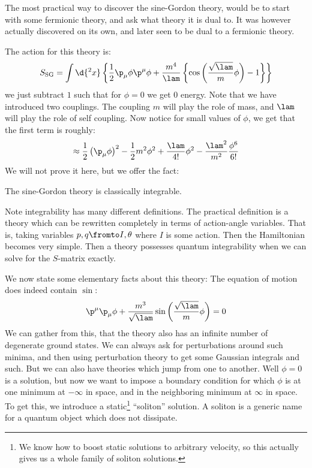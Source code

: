 \documentclass{booc}
\begin{document}
The most practical way to discover the sine-Gordon theory, would be to start with 
some fermionic theory, and ask what theory it is dual to.
It was however actually discovered on its own, and later seen to be dual to a fermionic theory.

The action for this theory is:
\begin{equation}
S_{\text{SG}} = 
\int \d{^2x}
\left\{ 
\frac{1}{2} \p_\mu \phi \p^\mu \phi
+ \frac{m^4}{\lam}\left\{ 
\cos\left( 
\frac{\sqrt{\lam}}{m} \phi
\right) - 1
\right\}
\right\}
\end{equation}
we just subtract $1$ such that for $\phi = 0$ we get $0$ energy.
Note that we have introduced two couplings. 
The coupling $m$ will play the role of mass, and $\lam$ will play the role of self coupling.
Now notice for small values of $\phi$, we get that the first term is roughly:
\begin{equation}
\approx \frac{1}{2} \left( \p_\mu \phi \right)^2 - 
\frac{1}{2} m^2 \phi^2 + \frac{\lam}{4!} \phi^2 - 
\frac{\lam^2}{m^2} \frac{\phi^6}{6!}
\end{equation}
We will not prove it here, but we offer the fact:

\begin{prop}
The sine-Gordon theory is classically integrable.
\end{prop}

Note integrability has many different definitions.
The practical definition is a theory which can be rewritten
completely in terms of action-angle variables.
That is, taking variables $p , q \fromto I , \theta$ where $I$ is some action. 
Then the Hamiltonian becomes very simple. 
Then a theory possesses quantum integrability 
when we can solve for the $S$-matrix exactly.

We now state some elementary facts about this theory:
The equation of motion does indeed contain $\sin$:
\begin{equation}
\p^\mu \p_\mu \phi + 
\frac{m^3}{\sqrt{\lam}}\sin\left( \frac{\sqrt{\lam}}{m}\phi \right) = 0
\end{equation}
We can gather from this, that the theory also 
has an infinite number of degenerate ground states.
We can always ask for perturbations around such minima, and then using perturbation
theory to get some Gaussian integrals and such. 
But we can also have theories which jump from one to another. 
Well $\phi = 0$ is a solution, but now we want to 
impose a boundary condition for which $\phi$ is at one minimum
at $-\infty$ in space, and in the neighboring minimum at $\infty$ in space. 
To get this, we introduce a static\footnote{
We know how to boost static solutions to arbitrary
velocity, so this actually gives us a whole family of soliton solutions.}
``soliton'' solution.
A soliton is a generic name for a quantum object which does not dissipate.
\end{document}
